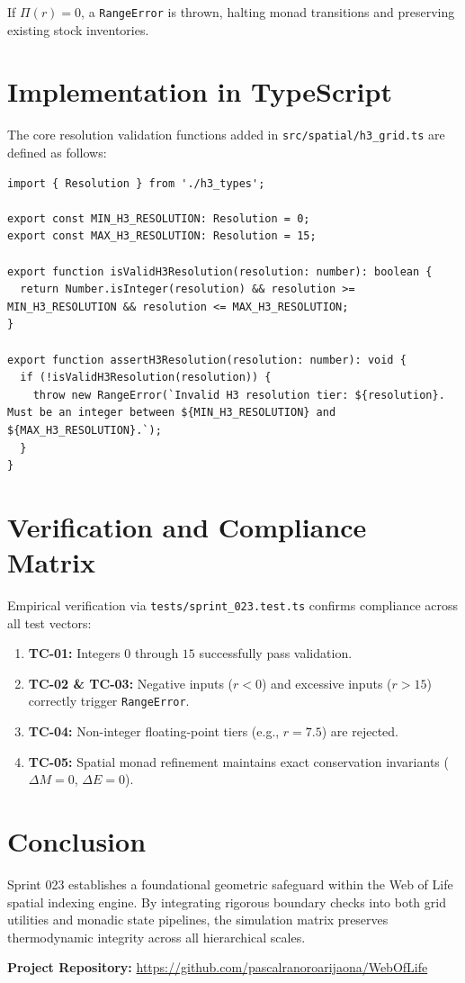 \documentclass[11pt, a4paper]{article}
\begin{document}
If $\Pi(r) = 0$, a \texttt{RangeError} is thrown, halting monad transitions and preserving existing stock inventories.

\section{Implementation in TypeScript}
The core resolution validation functions added in \texttt{src/spatial/h3\_grid.ts} are defined as follows:

\begin{lstlisting}
import { Resolution } from './h3_types';

export const MIN_H3_RESOLUTION: Resolution = 0;
export const MAX_H3_RESOLUTION: Resolution = 15;

export function isValidH3Resolution(resolution: number): boolean {
  return Number.isInteger(resolution) && resolution >= MIN_H3_RESOLUTION && resolution <= MAX_H3_RESOLUTION;
}

export function assertH3Resolution(resolution: number): void {
  if (!isValidH3Resolution(resolution)) {
    throw new RangeError(`Invalid H3 resolution tier: ${resolution}. Must be an integer between ${MIN_H3_RESOLUTION} and ${MAX_H3_RESOLUTION}.`);
  }
}
\end{lstlisting}

\section{Verification and Compliance Matrix}
Empirical verification via \texttt{tests/sprint\_023.test.ts} confirms compliance across all test vectors:
\begin{enumerate}
    \item \textbf{TC-01:} Integers $0$ through $15$ successfully pass validation.
    \item \textbf{TC-02 \& TC-03:} Negative inputs ($r < 0$) and excessive inputs ($r > 15$) correctly trigger \texttt{RangeError}.
    \item \textbf{TC-04:} Non-integer floating-point tiers (e.g., $r = 7.5$) are rejected.
    \item \textbf{TC-05:} Spatial monad refinement maintains exact conservation invariants ($\Delta M = 0$, $\Delta E = 0$).
\end{enumerate}

\section{Conclusion}
Sprint 023 establishes a foundational geometric safeguard within the Web of Life spatial indexing engine. By integrating rigorous boundary checks into both grid utilities and monadic state pipelines, the simulation matrix preserves thermodynamic integrity across all hierarchical scales.

\vspace{1em}
\noindent\textbf{Project Repository:} \url{https://github.com/pascalranoroarijaona/WebOfLife}
\end{document}
